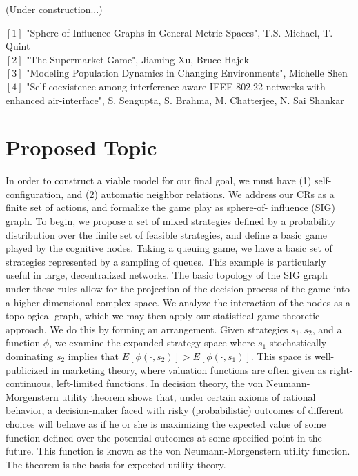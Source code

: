 \documentclass[10pt]{article}
\theoremstyle{definition}
\begin{document}
(Under construction...)

$[1]$ "Sphere of Influence Graphs in General Metric Spaces", T.S. Michael, T. Quint\\
$[2]$ "The Supermarket Game", Jiaming Xu, Bruce Hajek\\
$[3]$ "Modeling Population Dynamics in Changing Environments", Michelle Shen\\
$[4]$ "Self-coexistence among interference-aware IEEE 802.22 networks with enhanced air-interface", S. Sengupta, S. Brahma, M. Chatterjee, N. Sai Shankar\\

\section{Proposed Topic}


In order to construct a
viable model for our final goal, we must have (1) self-configuration, and (2) automatic neighbor
relations. We address our CRs as a finite set of actions, and formalize the game play as sphere-of-
influence (SIG) graph. To begin, we propose a set of mixed strategies defined by a probability
distribution over the finite set of feasible strategies, and define a basic game played by the
cognitive nodes.
Taking a queuing game, we have a basic set of strategies represented by a sampling of queues. This example is particularly useful in large, decentralized networks. The basic topology of the SIG graph under these rules allow for the projection of the decision process of the game into a higher-dimensional complex space. We analyze the interaction of the nodes as a topological graph, which we may then apply our statistical game theoretic approach. We do this by forming an arrangement. Given strategies $s_1, s_2$, and a function $\phi$, we examine the expanded strategy space where $s_1$ stochastically dominating $s_2$ implies that $E[\phi (\cdot, s_2 )] > E[\phi (\cdot, s_1 )]$. This space is well-publicized in marketing theory, where valuation functions are often given as right-continuous, left-limited functions. In decision theory, the von Neumann-Morgenstern utility theorem shows that, under certain axioms of rational behavior, a decision-maker faced with risky (probabilistic) outcomes of different choices will behave as if he or she is maximizing the expected value of some function defined over the potential outcomes at some specified point in the future. This function is known as the von Neumann-Morgenstern utility function. The theorem is the basis for expected utility theory.
\end{document}

